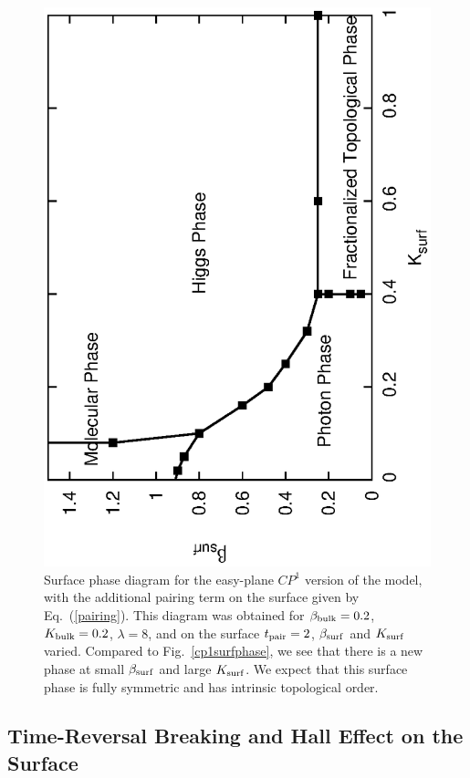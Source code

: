 \begin{figure}
\includegraphics[angle=-90,width=\linewidth]{figures/cp1surfacepairing.eps}
\caption{Surface phase diagram for the easy-plane $CP^1$ version of the model, with the additional pairing term on the surface given by Eq.~(\ref{pairing}). This diagram was obtained for $\beta_{\rm bulk}=0.2$, $K_{\rm bulk}=0.2$, $\lambda=8$, and on the surface $t_{\rm pair}=2$, $\beta_{\rm surf}$ and $K_{\rm surf}$ varied. Compared to Fig.~\ref{cp1surfphase}, we see that there is a new phase at small $\beta_{\rm surf}$ and large $K_{\rm surf}$.  We expect that this surface phase is fully symmetric and has intrinsic topological order.
}
\label{cp1surfpair}
\end{figure}

\subsection{Time-Reversal Breaking and Hall Effect on the Surface}
\label{cp1Hall}

